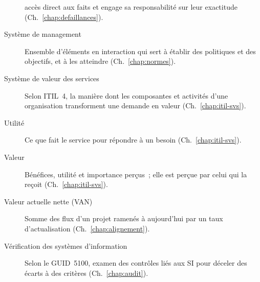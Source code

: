 \begin{description}
          accès direct aux faits et engage sa responsabilité sur leur
          exactitude (Ch.~\ref{chap:defaillances}).
    \item[Système de management] Ensemble d'éléments en interaction qui sert
          à établir des politiques et des objectifs, et à les atteindre
          (Ch.~\ref{chap:normes}).
    \item[Système de valeur des services] Selon ITIL~4, la manière dont les
          composantes et activités d'une organisation transforment une
          demande en valeur (Ch.~\ref{chap:itil-svs}).
    \item[Utilité] Ce que fait le service pour répondre à un besoin
          (Ch.~\ref{chap:itil-svs}).
    \item[Valeur] Bénéfices, utilité et importance perçus~; elle est perçue
          par celui qui la reçoit (Ch.~\ref{chap:itil-svs}).
    \item[Valeur actuelle nette (VAN)] Somme des flux d'un projet ramenés à
          aujourd'hui par un taux d'actualisation (Ch.~\ref{chap:alignement}).
    \item[Vérification des systèmes d'information] Selon le GUID~5100,
          examen des contrôles liés aux SI pour déceler des écarts à des
          critères (Ch.~\ref{chap:audit}).
\end{description}
